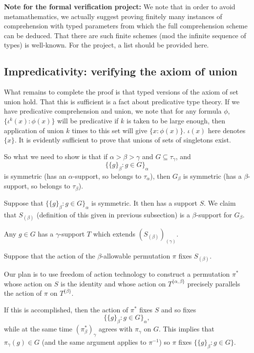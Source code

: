 \documentclass[112pt]{article}
\begin{document}
{\bf Note for the formal verification project:}  We note that in order to avoid metamathematics, we actually suggest proving finitely many instances of comprehension with typed parameters from which the full comprehension scheme can be deduced.  That there are such finite schemes (mod the infinite sequence of types) is well-known.  For the project, a list should be provided here.

\newpage
\subsection{Impredicativity:  verifying the axiom of union}

What remains to complete the proof is that typed versions of the axiom of set union hold.  That this is sufficient is a fact about predicative type theory.
If we have predicative comprehension and union, we note that for any formula $\phi$, $\{\iota^k(x):\phi(x)\}$ will be predicative if $k$ is taken to be large enough, then application of union $k$ times to this set will give $\{x:\phi(x)\}$.  $\iota(x)$ here denotes $\{x\}$.  It is evidently sufficient to prove that unions of sets of singletons exist.

So what we need to show is that if  $\alpha>\beta>\gamma$ and $G \subseteq \tau_\gamma$, and $$\{\{g\}_\beta:g \in G\}_\alpha$$ is symmetric (has an $\alpha$-support, so belongs to $\tau_\alpha$), then $G_\beta$ is symmetric (has a $\beta$-support, so belongs to $\tau_\beta$).

Suppose that $\{\{g\}_\beta:g \in G\}_\alpha$ is symmetric.  It then has a support $S$.  We claim that $S_{(\beta)}$ (definition of this given in previous subsection) is a $\beta$-support for $G_\beta$.

Any $g \in G$ has a $\gamma$-support $T$ which extends $(S_{(\beta)})_{(\gamma)}$. 

Suppose that the action of the $\beta$-allowable permutation $\pi$ fixes $S_{(\beta)}$.

Our plan is to use freedom of action technology to construct a permutation $\pi^*$ whose action on $S$ is the identity
and whose action on $T^{\{\alpha,\beta\}}$ precisely parallels the action of $\pi$ on $T^{\{\beta\}}$.

If this is accomplished, then the action of $\pi^*$ fixes $S$ and so fixes $$\{\{g\}_\beta:g \in G\}_\alpha,$$ while at the same
time $(\pi^*_\beta)_\gamma$ agrees with $\pi_\gamma$ on $G$.  This implies that $\pi_\gamma(g) \in G$ (and the same argument applies to $\pi^{-1}$)
so $\pi$ fixes $\{\{g\}_\beta:g \in G\}$.
\end{document}
